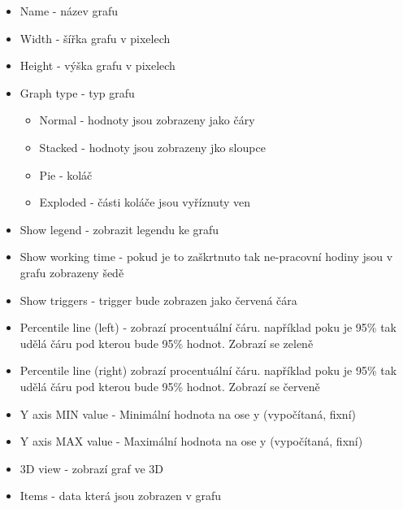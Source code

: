 \documentclass{article}
\begin{document}
\begin{itemize}
        \item Name -  název grafu
        \item Width - šířka grafu v pixelech
        \item Height - výška grafu v pixelech
        \item Graph type - typ grafu \begin{itemize}
            \item Normal - hodnoty jsou zobrazeny jako čáry
            \item Stacked - hodnoty jsou zobrazeny jko sloupce
            \item Pie - koláč
            \item Exploded - části koláče jsou vyříznuty ven
        \end{itemize}
        \item Show legend - zobrazit legendu ke grafu
        \item Show working time  - pokud je to zaškrtnuto tak ne-pracovní hodiny jsou v grafu zobrazeny šedě
        \item Show triggers - trigger bude zobrazen jako červená čára 
        \item Percentile line (left) - zobrazí procentuální čáru. například poku je 95\% tak udělá čáru pod kterou bude 95\% hodnot. Zobrazí se zeleně 
        \item Percentile line (right)  zobrazí procentuální čáru. například poku je 95\% tak udělá čáru pod kterou bude 95\% hodnot. Zobrazí se červeně 
        \item Y axis MIN value - Minimální hodnota na ose y (vypočítaná, fixní)
        \item Y axis MAX value - Maximální hodnota na ose y (vypočítaná, fixní)
        \item 3D view - zobrazí graf ve 3D
        \item Items - data která jsou zobrazen v grafu
    \end{itemize}
\end{document}
